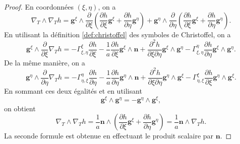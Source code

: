 \begin{proof}
En coordonnées $(\xi, \eta)$, on a
\begin{equation}
\nabla_T \wedge \nabla_T h = \mathbf{g}^{\xi} \wedge \dfrac{\partial}{\partial \xi} \left( \dfrac{\partial h}{\partial \xi} \mathbf{g}^{\xi} + \dfrac{\partial h}{\partial \eta} \mathbf{g}^{\eta}\right) + \mathbf{g}^{\eta} \wedge \dfrac{\partial}{\partial \eta} \left( \dfrac{\partial h}{\partial \xi} \mathbf{g}^{\xi} + \dfrac{\partial h}{\partial \eta} \mathbf{g}^{\eta}\right).
\end{equation}
En utilisant la définition \ref{def:christoffel} des symboles de Christoffel, on a
\begin{equation}
\mathbf{g}^{\xi} \wedge \dfrac{\partial}{\partial \xi}\nabla_T h = - \Gamma_{\xi,\eta}^{\xi} \dfrac{\partial h}{\partial \xi} - \dfrac{1}{a} \dfrac{\partial h}{\partial \xi} \mathbf{g}^{\xi} \wedge \mathbf{n} + \dfrac{\partial^2 h}{\partial \xi \partial \eta} \mathbf{g}^{\xi} \wedge \mathbf{g}^{\eta} - \Gamma_{\xi, \eta}^{\eta} \dfrac{\partial h}{\partial \eta} \mathbf{g}^{\xi} \wedge \mathbf{g}^{\eta}.
\end{equation}
De la même manière, on a
\begin{equation}
\mathbf{g}^{\eta} \wedge \dfrac{\partial}{\partial \eta}\nabla_T h = - \Gamma_{\eta,\xi}^{\eta} \dfrac{\partial h}{\partial \eta} - \dfrac{1}{a} \dfrac{\partial h}{\partial \eta} \mathbf{g}^{\eta} \wedge \mathbf{n} + \dfrac{\partial^2 h}{\partial \xi \partial \eta} \mathbf{g}^{\eta} \wedge \mathbf{g}^{\xi} - \Gamma_{\eta, \xi}^{\xi} \dfrac{\partial h}{\partial \xi} \mathbf{g}^{\eta} \wedge \mathbf{g}^{\xi}.
\end{equation}
En sommant ces deux égalités et en utilisant
\begin{equation}
\mathbf{g}^{\xi} \wedge \mathbf{g}^{\eta} = -\mathbf{g}^{\eta} \wedge \mathbf{g}^{\xi},
\end{equation}
on obtient
\begin{equation}
\nabla_T \wedge \nabla_T h = \dfrac{1}{a} \mathbf{n} \wedge \left( \dfrac{\partial h}{\partial \xi} \mathbf{g}^{\xi} + \dfrac{\partial h}{\partial \eta} \mathbf{g}^{\eta} \right) = \dfrac{1}{a} \mathbf{n} \wedge \nabla_T h.
\end{equation}
La seconde formule est obtenue en effectuant le produit scalaire par $\mathbf{n}$.
\end{proof}


